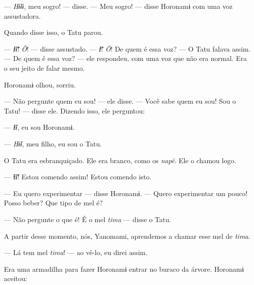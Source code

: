 --- \textit{Hɨ̃ɨɨ}, meu sogro! --- disse. --- Meu sogro! --- disse Horonamɨ com
uma voz assustadora. 

Quando disse isso, o Tatu parou. 

--- \textit{Ɨ̃ɨ̃}! \textit{Õ}! --- disse assustado. --- \textit{Ɨ̃}! \textit{Õ}! De quem é 
essa voz? --- O Tatu falava assim. --- De quem é essa voz? --- ele respondeu, com uma voz que
não era normal. Era o seu jeito de falar mesmo. 

Horonamɨ olhou, sorriu.


--- Não pergunte quem eu sou! --- ele disse. --- Você sabe quem eu sou!
Sou o Tatu! --- disse ele. Dizendo isso, ele perguntou: 


--- \textit{Ɨ̃ɨ}, eu sou Horonamɨ. 


--- \textit{Hɨ̃ɨ}, meu filho, eu sou o Tatu. 

O Tatu era esbranquiçado. Ele era branco, como os \textit{napë}. Ele o
chamou logo. 


--- Ɨ̃ɨ̃! Estou comendo assim! Estou comendo isto.

--- Eu quero experimentar --- disse Horonamɨ. --- Quero experimentar um
pouco! Posso beber? Que tipo de mel é? 

--- Não pergunte o que é! É o mel \textit{tima} --- disse o Tatu. 

A partir desse momento, nós, Yanomami, aprendemos a chamar esse mel
de \textit{tima}. 

--- Lá tem mel \textit{tima}! --- ao vê-lo, eu direi assim. 



Era uma armadilha para fazer Horonamɨ entrar no buraco da árvore. Horonamɨ
aceitou: 


